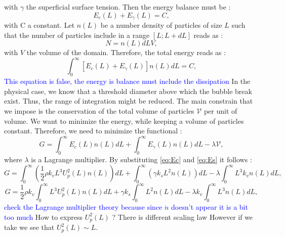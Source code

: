 \documentclass[10pt,a4paper,openany]{article}
\theoremstyle{mytheoremstyle}
\theoremstyle{mytheoremstyle}
\theoremstyle{myproblemstyle}
\begin{document}
with $\gamma$ the superficial surface tension. 
Then the energy balance must be : 
\begin{equation}
    E_c(L) +E_\gamma(L) = C,
\end{equation}
with C a constant. 
Let $n(L)$ be a number density of particles of size $L$ such that the number of particles include in a range $[L;L+dL]$ reads as :
\begin{equation*}
    N = n(L)dL V,
\end{equation*}
with $V$ the volume of the domain.
Therefore, the total energy reads as : 
\begin{equation}
    \int_0^\infty \left[E_c(L)  +E_\gamma(L)\right]n(L) dL = C,
\end{equation}
\textcolor{blue}{This equation is false, the energy is balance must include the dissipation}
In the physical case, we know that a threshold diameter above which the bubble break exist. 
Thus, the range of integration might be reduced.
The main constrain that we impose is the conservation of the total volume of particles $\mathcal{V}$ per unit of volume. 
We want to minimize the energy, while keeping a volume of particles constant.
Therefore, we need to minimize the functional :
\begin{equation}
    G =  \int_0^\infty E_c(L)n(L)dL + \int_0^\infty E_\gamma(L)n(L)dL - \lambda \mathcal{V},
\end{equation}
where $\lambda$ is a Lagrange multiplier.
By substituting \ref{eq:Ec} and \ref{eq:Es} it follows : 
\begin{equation}
    G =  \int_0^\infty \left(\frac{1}{2} \rho k_v L^3 U_p^2(L) n(L)\right)dL + \int_0^\infty \left(\gamma k_s L^2 n(L)\right)dL - \lambda \int_0^\infty L^3 k_v n(L) dL,
\end{equation}
\begin{equation}
    G =  \frac{1}{2} \rho k_v \int_0^\infty L^3 U_p^2(L) n(L)dL + \gamma k_s \int_0^\infty L^2 n(L)dL - \lambda k_v\int_0^\infty L^3  n(L) dL,
\end{equation}
\textcolor{blue}{check the Lagrange multiplier theory because since $\dot{n}$ doesn't appear it is a bit too much}
How to express $U_p^2(L)$ ? 
There is different scaling law However if we take \citet{tomiyama1998drag} we see that $U_p^2(L) \sim L$.
\end{document}
